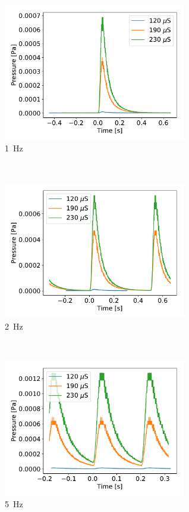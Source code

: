 \documentclass[a4paper,10pt]{article}
\begin{document}
\begin{figure}[H]
  \centering{}
  \begin{subfigure}[t]{0.45 \textwidth}
    \centering
    \includegraphics[height=6cm]{part1_1_hertz.pdf}
    \caption{\SI{1}{\hertz}}
  \end{subfigure}
  ~
  \begin{subfigure}[t]{0.45 \textwidth}
    \centering
    \includegraphics[height=6cm]{part1_2_hertz.pdf}
    \caption{\SI{2}{\hertz}}
  \end{subfigure}
  ~
  \begin{subfigure}[t]{0.45 \textwidth}
    \centering
    \includegraphics[height=6cm]{part1_5_hertz.pdf}
    \caption{\SI{5}{\hertz}}
  \end{subfigure}
  ~
  \begin{subfigure}[t]{0.45 \textwidth}

\end{subfigure}
\end{figure}
\end{document}
